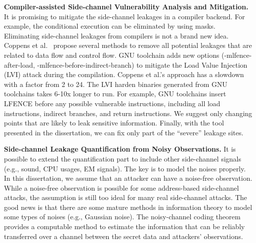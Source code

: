 \textbf{Compiler-assisted Side-channel Vulnerability Analysis and Mitigation.}
It is promising to mitigate the side-channel leakages in a compiler backend. For example, the conditional execution can be eliminated by using masks. Eliminating side-channel leakages from compilers is not a brand new idea. Coppens et al.~\cite{Coppens:2009:PMT:1607723.1608124} propose several methods to remove all potential leakages that are related to data flow and control flow.  GNU toolchain adds new options (\textsf{-mlfence-after-load}, \textsf{-mlfence-before-indirect-branch}) to mitigate the Load Value Injection (LVI) attack during the compilation. Coppens et al.'s approach has a slowdown with a factor from 2 to 24. The LVI harden binaries generated from GNU toolchains takes 6-10x longer to run.  For example, GNU toolchains insert \textsf{LFENCE} before any possible vulnerable instructions, including all load instructions, indirect branches, and return instructions. We suggest only changing points that are likely to leak sensitive information. Finally, with the tool presented in the dissertation, we can fix only part of the ``severe'' leakage sites.

\textbf{Side-channel Leakage Quantification from Noisy Observations.} It is possible to extend the quantification part to include other side-channel
signals (e.g., sound, CPU usages, EM signals). The key is to model the noises
properly. In this dissertation, we assume that an attacker can have a noise-free
observation. While a noise-free observation is possible for some address-based
side-channel attacks, the assumption is still too ideal for many real side-channel
attacks. The good news is that there are some mature methods in information theory to model some types of noises (e.g., Gaussian noise). The noisy-channel coding theorem~\cite{shannon1948mathematical} provides a
computable method to estimate the information that can be reliably transferred over a channel between the secret data and attackers' observations. 
